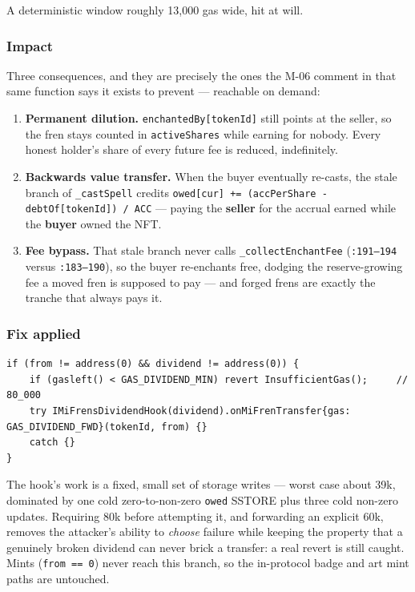 \documentclass[11pt,a4paper]{article}
\newcommand{\code}[1]{\texttt{\small #1}}
\newcommand{\fileref}[1]{\texttt{\scriptsize #1}}
\begin{document}
A deterministic window roughly 13{,}000 gas wide, hit at will.

\subsubsection*{Impact}

Three consequences, and they are precisely the ones the M-06 comment in that same
function says it exists to prevent --- reachable on demand:

\begin{enumerate}
\item \textbf{Permanent dilution.} \code{enchantedBy[tokenId]} still points at the
seller, so the fren stays counted in \code{activeShares} while earning for nobody.
Every honest holder's share of every future fee is reduced, indefinitely.
\item \textbf{Backwards value transfer.} When the buyer eventually re-casts, the
stale branch of \code{\_castSpell} credits
\code{owed[cur] += (accPerShare - debtOf[tokenId]) / ACC} --- paying the
\textbf{seller} for the accrual earned while the \textbf{buyer} owned the NFT.
\item \textbf{Fee bypass.} That stale branch never calls
\code{\_collectEnchantFee} (\fileref{:191--194} versus \fileref{:183--190}), so the
buyer re-enchants free, dodging the reserve-growing fee a moved fren is supposed
to pay --- and forged frens are exactly the tranche that always pays it.
\end{enumerate}

\subsubsection*{Fix applied}

\begin{lstlisting}
if (from != address(0) && dividend != address(0)) {
    if (gasleft() < GAS_DIVIDEND_MIN) revert InsufficientGas();     // 80_000
    try IMiFrensDividendHook(dividend).onMiFrenTransfer{gas: GAS_DIVIDEND_FWD}(tokenId, from) {}
    catch {}
}
\end{lstlisting}

The hook's work is a fixed, small set of storage writes --- worst case about 39k,
dominated by one cold zero-to-non-zero \code{owed} SSTORE plus three cold non-zero
updates. Requiring 80k before attempting it, and forwarding an explicit 60k,
removes the attacker's ability to \emph{choose} failure while keeping the property
that a genuinely broken dividend can never brick a transfer: a real revert is
still caught. Mints (\code{from == 0}) never reach this branch, so the in-protocol
badge and art mint paths are untouched.
\end{document}
